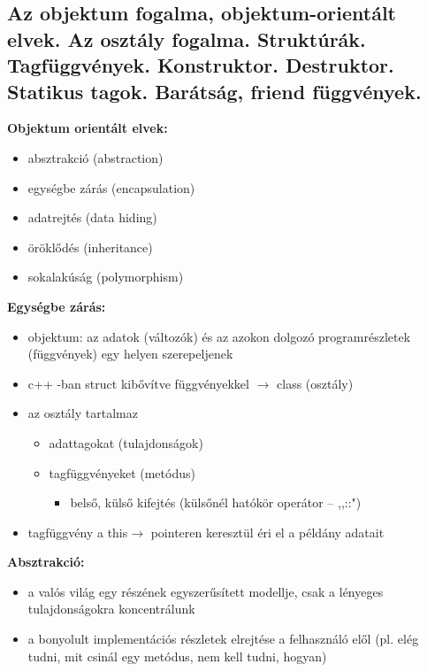 \subsection{Az objektum fogalma, objektum-orientált elvek. Az osztály fogalma. Struktúrák. Tagfüggvények. Konstruktor. Destruktor. Statikus tagok. Barátság, friend függvények.}

\noindent \textbf{Objektum orientált elvek:}
\begin{itemize}
    \item absztrakció (abstraction)
    \item egységbe zárás (encapsulation)
    \item adatrejtés (data hiding)
    \item öröklődés (inheritance)
    \item sokalakúság (polymorphism)
\end{itemize}

\noindent \textbf{Egységbe zárás:}
\begin{itemize}
    \item objektum: az adatok (változók) és az azokon dolgozó programrészletek (függvények) egy helyen szerepeljenek
    \item c++ -ban struct kibővítve függvényekkel $\rightarrow$ class (osztály)
    \item az osztály tartalmaz
    \begin{itemize}
        \item adattagokat (tulajdonságok)
        \item tagfüggvényeket (metódus)
        \begin{itemize}
            \item belső, külső kifejtés (külsőnél hatókör operátor -- ,,::")
        \end{itemize}
    \end{itemize}
    \item tagfüggvény a this$\rightarrow$ pointeren keresztül éri el a példány adatait
\end{itemize}

\noindent \textbf{Absztrakció:}
\begin{itemize}
    \item a valós világ egy részének egyszerűsített modellje, csak a lényeges tulajdonságokra koncentrálunk
    \item a bonyolult implementációs részletek elrejtése a felhasználó elől (pl. elég tudni, mit csinál egy metódus, nem kell tudni, hogyan)
\end{itemize}

